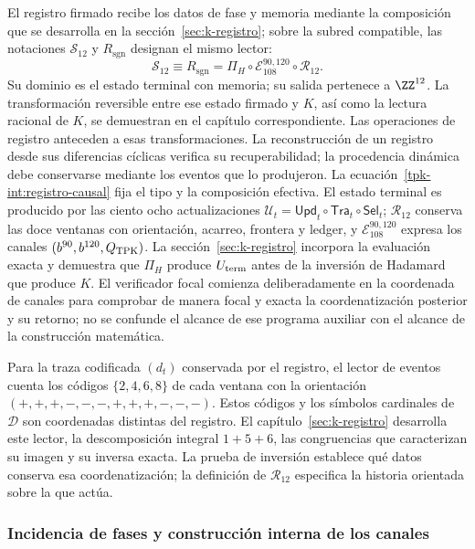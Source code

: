 El registro firmado recibe los datos de fase y memoria mediante la
composición que se desarrolla en la sección~\ref{sec:k-registro}; sobre la
subred compatible, las notaciones \(\mathcal S_{12}\) y
\(R_{\mathrm{sgn}}\) designan el mismo lector:
\begin{equation}
 \mathcal S_{12}\equiv R_{\mathrm{sgn}}
 =\Pi_H\circ\mathcal E_{108}^{90,120}
                         \circ\mathcal R_{12}.
 \label{tpk-int:registro-causal}
\end{equation}
Su dominio es el estado terminal con memoria; su salida pertenece a
\(\ZZ^{12}\). La transformación reversible entre ese estado firmado
y \(K\), así como la lectura racional de \(K\), se demuestran en
el capítulo correspondiente. Las operaciones de registro anteceden a
esas transformaciones. La reconstrucción de un registro desde sus
diferencias cíclicas verifica su recuperabilidad; la procedencia dinámica
debe conservarse mediante los eventos que lo produjeron.
La ecuación~\eqref{tpk-int:registro-causal} fija el tipo y la composición
efectiva. El estado terminal es producido por las ciento ocho actualizaciones
\(\mathcal U_t=\mathsf{Upd}_t\circ\mathsf{Tra}_t\circ\mathsf{Sel}_t\);
\(\mathcal R_{12}\) conserva las doce ventanas con orientación, acarreo,
frontera y ledger, y \(\mathcal E_{108}^{90,120}\) expresa los canales
\((b^{90},b^{120},Q_{\rm TPK})\). La
sección~\ref{sec:k-registro} incorpora la evaluación exacta y demuestra que
\(\Pi_H\) produce \(U_{\rm term}\) antes de la inversión de Hadamard que
produce \(K\). El verificador focal comienza deliberadamente en la coordenada
de canales para comprobar de manera focal y exacta la coordenatización posterior y su
retorno; no se confunde el alcance de ese programa auxiliar con el alcance de
la construcción matemática.

Para la traza codificada \((d_t)\) conservada por el registro, el
lector de eventos cuenta los códigos \(\{2,4,6,8\}\) de cada
ventana con la orientación
\((+,+,+,-,-,-,+,+,+,-,-,-)\). Estos códigos y los símbolos
cardinales de \(\mathcal D\) son coordenadas distintas del
registro. El capítulo~\ref{sec:k-registro} desarrolla este lector,
la descomposición integral \(1+5+6\), las congruencias que
caracterizan su imagen y su inversa exacta. La prueba de inversión
establece qué datos conserva esa coordenatización; la definición de
\(\mathcal R_{12}\) especifica la historia orientada sobre la que
actúa.

\subsubsection{Incidencia de fases y construcción interna de los canales}
\label{tpk-int:incidencia}

